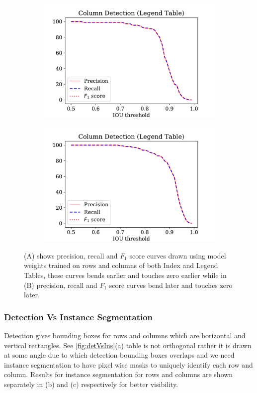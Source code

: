 \begin{figure}[h!]
\centering
\begin{subfigure}{0.48\linewidth}
  \centering
  \includegraphics[width=\linewidth]{col_legend_pRf.pdf}
    \caption{}
    \label{}
\end{subfigure}
\begin{subfigure}{0.48\linewidth}
  \centering
  \includegraphics[width=\linewidth]{col_legend_improved_pRf.pdf}
    \caption{}
    \label{}
\end{subfigure}
\caption{(A) shows precision, recall and $F_1$ score curves drawn using model weights trained on rows and columns of both Index and Legend Tables, these curves bends earlier and touches zero earlier while in (B) precision, recall and $F_1$ score curves bend later and touches zero later.}
\label{fig:rowCol_legend_improved_graph}
\end{figure}
\subsubsection{Detection Vs Instance Segmentation}
\label{sec:expResults_instanceSeg}
Detection gives bounding boxes for rows and columns which are horizontal and vertical rectangles. See \autoref{fig:detVsIns}(a) table is not orthogonal rather it is drawn at some angle due to which detection bounding boxes overlaps and we need instance segmentation to have pixel wise masks to uniquely identify each row and column. Results for instance segmentation for rows and columns are shown separately in (b) and (c) respectively for better visibility.


